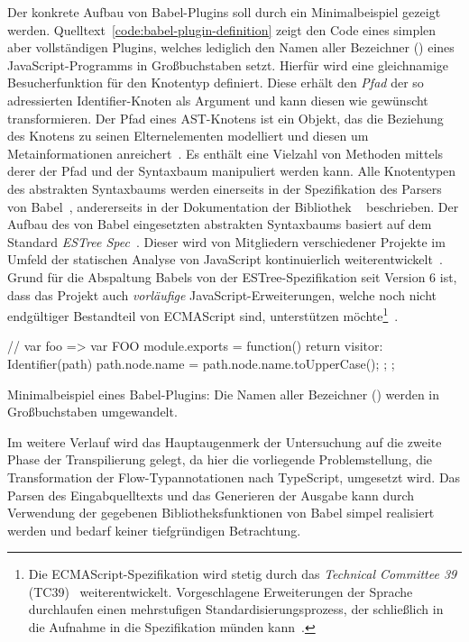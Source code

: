 Der konkrete Aufbau von Babel-Plugins soll durch ein Minimalbeispiel gezeigt werden. Quelltext~\ref{code:babel-plugin-definition} zeigt den Code eines simplen aber vollständigen Plugins, welches lediglich den Namen aller Bezeichner () eines JavaScript-Programms in Großbuchstaben setzt. Hierfür wird eine gleichnamige Besucherfunktion für den Knotentyp  definiert. Diese erhält den \emph{Pfad} der so adressierten Identifier-Knoten als Argument und kann diesen wie gewünscht transformieren. Der Pfad eines AST-Knotens ist ein Objekt, das die Beziehung des Knotens zu seinen Elternelementen modelliert und diesen um Metainformationen anreichert~\autocite{BABEL:HANDBOOK}. Es enthält eine Vielzahl von Methoden mittels derer der Pfad und der Syntaxbaum manipuliert werden kann.
Alle Knotentypen des abstrakten Syntaxbaums werden einerseits in der Spezifikation des Parsers von Babel~\autocite{BABEL:PARSER_SPEC,BABEL:PARSER}, andererseits in der Dokumentation der Bibliothek ~\autocite{BABEL:TYPES} beschrieben. Der Aufbau des von Babel eingesetzten abstrakten Syntaxbaums basiert auf dem Standard \textit{ESTree Spec}~\autocite{ESTREE_SPEC}. Dieser wird von Mitgliedern verschiedener Projekte im Umfeld der statischen Analyse von JavaScript kontinuierlich weiterentwickelt~\autocite{BABEL:PARSER,ESTREE_SPEC}. Grund für die Abspaltung Babels von der ESTree-Spezifikation seit Version 6 ist, dass das Projekt auch \emph{vorläufige} JavaScript-Erweiterungen, welche noch nicht endgültiger Bestandteil von ECMAScript sind, unterstützen möchte\footnote{Die ECMAScript-Spezifikation wird stetig durch das \textit{Technical Committee 39} (TC39)~\autocite{TC39_COMMITTEE} weiterentwickelt. Vorgeschlagene Erweiterungen der Sprache durchlaufen einen mehrstufigen Standardisierungsprozess, der schließlich in die Aufnahme in die Spezifikation münden kann~\autocite{TC39_PROCESS}.}~\autocite{BABEL:STATE_OF_BABEL}.

\bigbreak
\begin{listing}[htb]
\begin{textcode}
// var foo => var FOO
module.exports = function() {
  return {
    visitor: {
      Identifier(path) {
        path.node.name = path.node.name.toUpperCase();
      }
    }
  };
};
\end{textcode}
\listingvspace
\caption[Minimalbeispiel eines Babel-Plugins]{Minimalbeispiel eines Babel-Plugins: Die Namen aller Bezeichner () werden in Großbuchstaben umgewandelt.}
  \label{code:babel-plugin-definition}
\end{listing}

Im weitere Verlauf wird das Hauptaugenmerk der Untersuchung auf die zweite Phase der Transpilierung gelegt, da hier die vorliegende Problemstellung, die Transformation der Flow-Typannotationen nach TypeScript, umgesetzt wird. Das Parsen des Eingabquelltexts und das Generieren der Ausgabe kann durch Verwendung der gegebenen Bibliotheksfunktionen von Babel simpel realisiert werden und bedarf keiner tiefgründigen Betrachtung.
